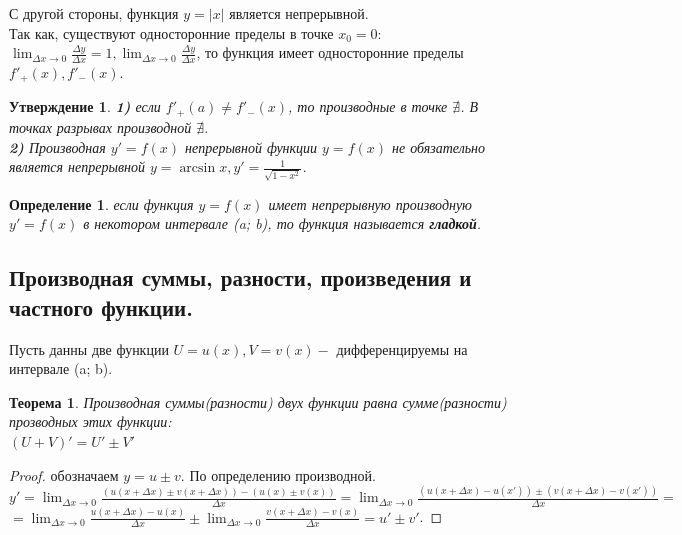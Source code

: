 \documentclass[12pt, a4paper]{article}
\newtheorem{theorem}{Теорема}[subsection]
\newtheorem{definition}{Определение}[subsection]
\newtheorem{statement}{Утверждение}[subsection]
\theoremstyle{remark}
\begin{document}
	С другой стороны, функция $y = |x|$ является непрерывной. \\
	
	Так как, существуют односторонние пределы в точке $x_0 = 0:$ $\lim_{\Delta x \to 0} \frac{\Delta y}{\Delta x} = 1, \lim_{\Delta x \to 0} \frac{\Delta y}{\Delta x}$, то функция имеет односторонние пределы $f'_+(x), f'_-(x)$.
	
	\begin{statement}
		\textbf{1)} если $f'_+(a) \neq f'_-(x)$, то производные в точке $\nexists$. В точках разрывах производной $\nexists$. \\
		
		\textbf{2)} Производная $y' = f(x)$ непрерывной функции $y = f(x)$ не обязательно является непрерывной $y = \arcsin x, y' = \frac{1}{\sqrt{1 - x^2}}$.
	\end{statement}
	
	\newpage
	
	\begin{definition}
		если функция $y = f(x)$ имеет непрерывную производную $y' = f(x)$ в некотором интервале (a; b), то функция называется \textbf{гладкой}.
	\end{definition}
	
	\subsection{Производная суммы, разности, произведения и частного функции.} 
	
	Пусть данны две функции $U = u(x), V = v(x) -$ дифференцируемы на интервале (a; b).
	
	\begin{theorem}
		Производная суммы(разности) двух функции равна сумме(разности) прозводных этих функции: \\
		
		$(U + V)' = U' \pm V'$
	\end{theorem}
	
	\begin{proof}
		обозначаем $y = u \pm v.$ По определению производной. \\
		
		$y' = \lim_{\Delta x \to 0} \frac{(u(x + \Delta x) \pm v(x + \Delta x)) - (u(x) \pm v(x))}{\Delta x} = \lim_{\Delta x \to 0} \frac{(u(x + \Delta x) - u(x')) \pm (v(x + \Delta x) - v(x'))}{\Delta x} =$\\
		
		$ = \lim_{\Delta x \to 0} \frac{u(x + \Delta x) - u(x)}{\Delta x} \pm \lim_{\Delta x \to 0} \frac{v(x + \Delta x) - v(x)}{\Delta x} = u' \pm v'$.
	\end{proof}
	
\end{document}
